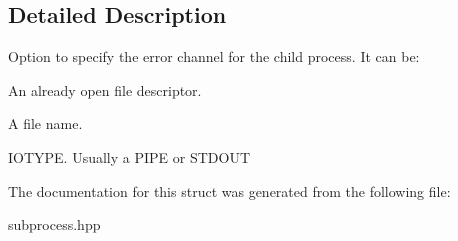 \subsection{Detailed Description}
Option to specify the error channel for the child process. It can be\+:
\begin{DoxyEnumerate}
\item An already open file descriptor.
\item A file name.
\item I\+O\+T\+Y\+PE. Usually a P\+I\+PE or S\+T\+D\+O\+UT 
\end{DoxyEnumerate}

The documentation for this struct was generated from the following file\+:\begin{DoxyCompactItemize}
\item 
subprocess.\+hpp\end{DoxyCompactItemize}
